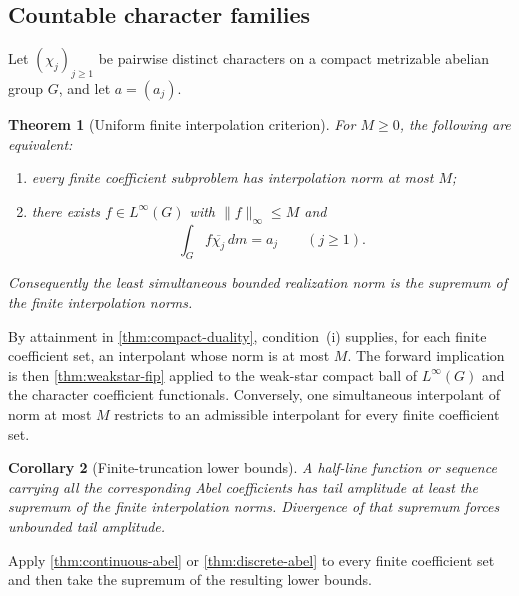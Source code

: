 \documentclass[12pt,a4paper,twoside]{extarticle}
\makeatletter
\theoremstyle{compactplain}
\newtheorem{theorem}{Theorem}[section]
\newtheorem{corollary}[theorem]{Corollary}
\theoremstyle{compactdef}
\renewenvironment{proof}[1][\proofname]{\par\pushQED{\qed}\normalfont
  \topsep2pt\trivlist\item[\hskip\labelsep\bfseries #1\@addpunct{.}]\ignorespaces}
 {\popQED\endtrivlist\@endpefalse}
\makeatother
\begin{document}
\subsection{Countable character families}
Let $(\chi_j)_{j\ge1}$ be pairwise distinct characters on a compact metrizable abelian group $G$, and let $a=(a_j)$.
\begin{theorem}[Uniform finite interpolation criterion]\label{thm:countable-interpolation}
For $M\ge0$, the following are equivalent:
\begin{enumerate}[label=(\roman*)]
\item every finite coefficient subproblem has interpolation norm at most $M$;
\item there exists $f\in L^\infty(G)$ with $\|f\|_\infty\le M$ and
\[
 \int_Gf\overline{\chi_j}\,dm=a_j\qquad(j\ge1).
\]
\end{enumerate}
Consequently the least simultaneous bounded realization norm is the supremum of the finite interpolation norms.
\end{theorem}
\begin{proof}
By attainment in \cref{thm:compact-duality}, condition~(i) supplies, for each finite coefficient set, an interpolant whose norm is at most $M$.  The forward implication is then \cref{thm:weakstar-fip} applied to the weak-star compact ball of $L^\infty(G)$ and the character coefficient functionals.  Conversely, one simultaneous interpolant of norm at most $M$ restricts to an admissible interpolant for every finite coefficient set.
\end{proof}

\begin{corollary}[Finite-truncation lower bounds]
A half-line function or sequence carrying all the corresponding Abel coefficients has tail amplitude at least the supremum of the finite interpolation norms.  Divergence of that supremum forces unbounded tail amplitude.
\end{corollary}
\begin{proof}
Apply \cref{thm:continuous-abel} or \cref{thm:discrete-abel} to every finite coefficient set and then take the supremum of the resulting lower bounds.
\end{proof}
\end{document}
